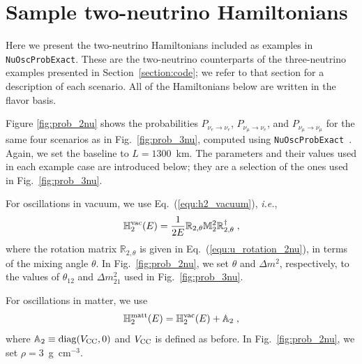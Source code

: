 \documentclass[final,5p,times,twocolumn]{elsarticle}
\newcommand{\ie}{{\it i.e.}}
\newcommand{\eq}{Eq.}
\newcommand{\fig}{Fig.}
\newcommand{\equ}[1]{\eq~(\ref{equ:#1})}
\newcommand{\figu}[1]{\fig~\ref{fig:#1}}
\begin{document}
\newpage




\section{Sample two-neutrino Hamiltonians}
\label{appendix:sample_2nu_hamiltonians}

Here we present the two-neutrino Hamiltonians included as examples in {\tt NuOscProbExact}.  These are the two-neutrino counterparts of the three-neutrino examples presented in Section\ \ref{section:code}; we refer to that section for a description of each scenario.  All of the Hamiltonians below are written in the flavor basis.

Figure \ref{fig:prob_2nu} shows the probabilities $P_{\nu_e \to \nu_e}$, $P_{\nu_\mu \to \nu_e}$, and $P_{\nu_\mu \to \nu_\mu}$ for the same four scenarios as in \figu{prob_3nu}, computed using {\tt NuOscProbExact}\ \cite{NuOscProbExact}.  Again, we set the baseline to $L = 1300$~km.  The parameters and their values used in each example case are introduced below; they are a selection of the ones used in \figu{prob_3nu}.

For oscillations in vacuum, we use \equ{h2_vacuum}, \ie,
\begin{equation*}
 \mathbb{H}_2^{\rm vac}(E)
 =
 \frac{1}{2E}
 \mathbb{R}_{2,\theta}
 \mathbb{M}_2^2
 \mathbb{R}_{2,\theta}^\dagger \;,
\end{equation*}
where the rotation matrix $\mathbb{R}_{2,\theta}$ is given in \equ{u_rotation_2nu}, in terms of the mixing angle $\theta$.  In \figu{prob_2nu}, we set $\theta$ and $\Delta m^2$, respectively, to the values of $\theta_{12}$ and $\Delta m_{21}^2$ used in \figu{prob_3nu}.

For oscillations in matter, we use
\begin{equation*}
 \label{equ:h2_matt}
 \mathbb{H}_2^{\rm matt}(E) 
 = 
 \mathbb{H}_2^{\rm vac}(E)  + \mathbb{A}_2 \;,
\end{equation*}
where $\mathbb{A}_2 \equiv {\rm diag}(V_{\rm CC}, 0)$ and $V_{\rm CC}$ is defined as before.  In \figu{prob_2nu}, we set $\rho = 3$~g~cm$^{-3}$.
\end{document}
